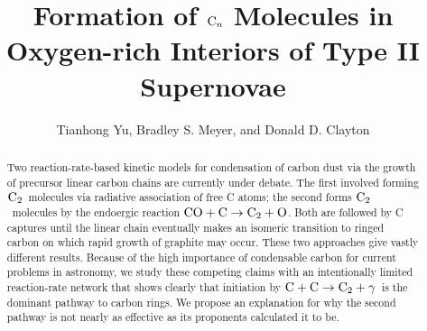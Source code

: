 \documentclass[manuscript]{aastex}
\newcommand{\ctwo}{{\rm C}_2}
\newcommand{\cenn}{{\rm C}_n}
\newcommand{\twoctoctwo}{${\rm C} + {\rm C} \to \ctwo + \gamma$}
\newcommand{\coctoctwo}{${\rm CO} + {\rm C} \to \ctwo + {\rm O}$}
\begin{document}

\title{Formation of $\cenn$ Molecules in Oxygen-rich Interiors of Type II
Supernovae}


\author{Tianhong Yu, Bradley S. Meyer, and Donald D. Clayton}



\begin{abstract}
Two reaction-rate-based kinetic models for condensation of carbon dust via the
growth of precursor linear carbon chains are currently under debate. The first
involved forming $\ctwo$\ molecules via radiative association of free C
atoms; the second forms $\ctwo$\ molecules by the endoergic reaction
\coctoctwo. Both are
followed by C captures until the linear chain eventually makes an isomeric
transition to ringed carbon on which rapid growth of graphite may occur.
These two approaches give vastly different results. Because of the high
importance of condensable carbon for current problems in astronomy,
we study these competing claims with an intentionally limited reaction-rate
network that shows clearly that initiation by
\twoctoctwo\ is the dominant
pathway to carbon rings. We propose an explanation for why the second pathway
is not nearly as effective as its proponents calculated it to be.
\end{abstract}
\end{document}
